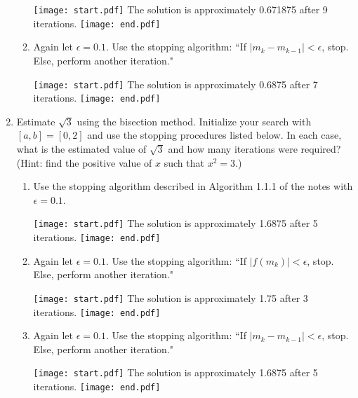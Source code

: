 \documentclass[12pt]{article}
\begin{document}
\begin{enumerate}
\begin{enumerate}
\texttt{[image: start.pdf]}
{The solution is approximately 0.671875 after 9 iterations.}
\texttt{[image: end.pdf]}


\item Again let $\epsilon=0.1$.  Use the stopping algorithm: ``If $|m_k-m_{k-1}|<\epsilon$, stop.  Else, perform another iteration."

\texttt{[image: start.pdf]}
{The solution is approximately 0.6875 after 7 iterations.}
\texttt{[image: end.pdf]}


\end{enumerate}

\newpage

\item Estimate $\sqrt{3}$ using the bisection method.  Initialize your search with $[a,b]=[0,2]$ and use the stopping procedures listed below.  In each case, what is the estimated value of $\sqrt{3}$ and how many iterations were required?  (Hint: find the positive value of $x$ such that $x^2=3$.)

\begin{enumerate}

\item Use the stopping algorithm described in Algorithm 1.1.1 of the notes with $\epsilon=0.1$.

\texttt{[image: start.pdf]}
{The solution is approximately 1.6875 after 5 iterations.}
\texttt{[image: end.pdf]}


\item Again let $\epsilon=0.1$.  Use the stopping algorithm: ``If $|f(m_k)|<\epsilon$, stop.  Else, perform another iteration."

\texttt{[image: start.pdf]}
{The solution is approximately 1.75 after 3 iterations.}
\texttt{[image: end.pdf]}


\item Again let $\epsilon=0.1$.  Use the stopping algorithm: ``If $|m_k-m_{k-1}|<\epsilon$, stop.  Else, perform another iteration."

\texttt{[image: start.pdf]}
{The solution is approximately 1.6875 after 5 iterations.}
\texttt{[image: end.pdf]}


\end{enumerate}


\end{enumerate}
\end{document}
